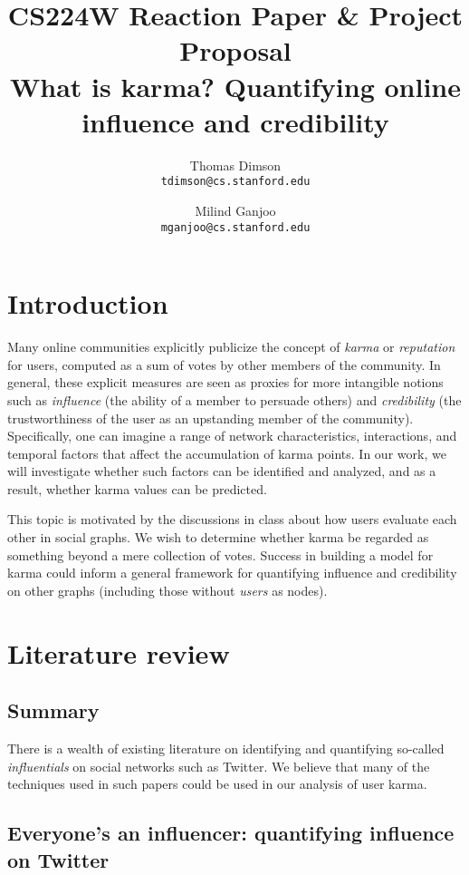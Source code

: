 \documentclass[10pt]{article}
\title{
  {\large CS224W Reaction Paper \& Project Proposal} \\
  What is karma? Quantifying online influence and credibility
}
\author{
  Thomas Dimson \\ {\tt tdimson@cs.stanford.edu}
  \and
  Milind Ganjoo \\ {\tt mganjoo@cs.stanford.edu}
}
\date{}
\begin{document}
\maketitle

\section{Introduction}

Many online communities explicitly publicize the concept of \textit{karma} or
\textit{reputation} for users, computed as a sum of votes by other members of
the community. In general, these explicit measures are seen as proxies for more
intangible notions such as \textit{influence} (the ability of a member to
persuade others) and \textit{credibility} (the trustworthiness of the user as an
upstanding member of the community). Specifically, one can imagine a range of
network characteristics, interactions, and temporal factors that affect the
accumulation of karma points. In our work, we will investigate whether such
factors can be identified and analyzed, and as a result, whether karma values
can be predicted.

This topic is motivated by the discussions in class about how users evaluate
each other in social graphs. We wish to determine whether karma be regarded
as something beyond a mere collection of votes. Success in building a model for
karma could inform a general framework for quantifying influence and credibility
on other graphs (including those without \textit{users} as nodes).

\section{Literature review}

\subsection{Summary}
There is a wealth of existing literature on identifying and quantifying
so-called \textit{influentials} on social networks such as Twitter. We believe
that many of the techniques used in such papers could be used in our analysis of
user karma.


\subsection{Everyone's an influencer: quantifying influence on Twitter \citep{bakshy2011everyone}}
\end{document}
